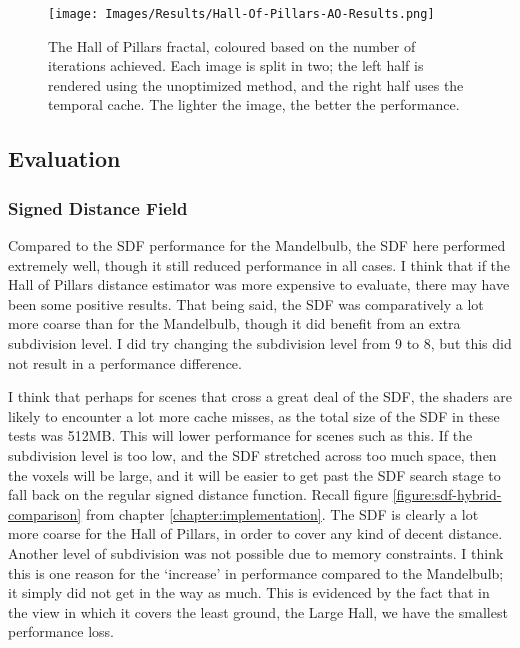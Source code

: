 \begin{figure}[ht]
	\centering
	\texttt{[image: Images/Results/Hall-Of-Pillars-AO-Results.png]}
	\caption{The Hall of Pillars fractal, coloured based on the number of iterations achieved. Each image is split in two; the left half is rendered using the unoptimized method, and the right half uses the temporal cache. The lighter the image, the better the performance.}
	\label{figure:hall-of-pillars-ao-results}
\end{figure}

\subsection{Evaluation}

\subsubsection{Signed Distance Field}

Compared to the SDF performance for the Mandelbulb, the SDF here performed extremely well, though it still reduced performance in all cases. I think that if the Hall of Pillars distance estimator was more expensive to evaluate, there may have been some positive results. That being said, the SDF was comparatively a lot more coarse than for the Mandelbulb, though it did benefit from an extra subdivision level. I did try changing the subdivision level from 9 to 8, but this did not result in a performance difference.\newline

I think that perhaps for scenes that cross a great deal of the SDF, the shaders are likely to encounter a lot more cache misses, as the total size of the SDF in these tests was 512MB. This will lower performance for scenes such as this. If the subdivision level is too low, and the SDF stretched across too much space, then the voxels will be large, and it will be easier to get past the SDF search stage to fall back on the regular signed distance function. Recall figure \ref{figure:sdf-hybrid-comparison} from chapter \ref{chapter:implementation}. The SDF is clearly a lot more coarse for the Hall of Pillars, in order to cover any kind of decent distance. Another level of subdivision was not possible due to memory constraints. I think this is one reason for the `increase' in performance compared to the Mandelbulb; it simply did not get in the way as much. This is evidenced by the fact that in the view in which it covers the least ground, the Large Hall, we have the smallest performance loss.\newline

